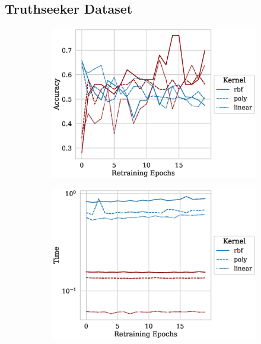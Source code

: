 \documentclass[fonts]{icst}
\begin{document}
\begin{appendices}
\section{Truthseeker Dataset}
\label{appendix-2}
\begin{figure}[h!]
     \centering
     \begin{subfigure}{0.47\textwidth}
         \centering
         \includegraphics[width=\textwidth]{./truthseeker/retrain_accuracy.eps}
     \end{subfigure}
     \hfill
     \begin{subfigure}{0.47\textwidth}
         \centering
         \includegraphics[width=\textwidth]{./truthseeker/retrain_time.eps}
     \end{subfigure}

\end{figure}
\end{appendices}
\end{document}

